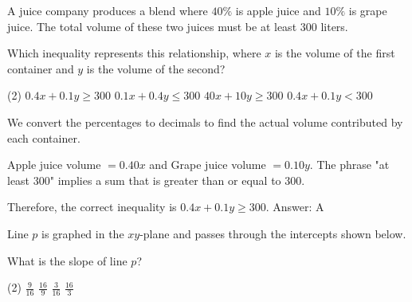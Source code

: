 \documentclass[11pt,paper=a4,answers]{exam}
\begin{document}
\begin{questions}
\vspace{1cm}

\question
A juice company produces a blend where $40\%$ is apple juice and $10\%$ is grape juice. The total volume of these two juices must be at least $300$ liters.
\begin{center}
\end{center}
Which inequality represents this relationship, where $x$ is the volume of the first container and $y$ is the volume of the second?
\begin{tasks}(2)
\task $0.4x + 0.1y \geq 300$
\task $0.1x + 0.4y \leq 300$
\task $40x + 10y \geq 300$
\task $0.4x + 0.1y < 300$
\end{tasks}

\begin{solution}
We convert the percentages to decimals to find the actual volume contributed by each container.
\vspace{5pt}
\begin{center}
Apple juice volume $= 0.40x$ and Grape juice volume $= 0.10y$.
\vspace{5pt}
The phrase "at least $300$" implies a sum that is greater than or equal to $300$.
\end{center}
\vspace{5pt}
Therefore, the correct inequality is $0.4x + 0.1y \geq 300$.
\vspace{5pt}
Answer: \colorbox{yellow!100}{A}
\end{solution}

\vspace{1cm}

\question
Line $p$ is graphed in the $xy$-plane and passes through the intercepts shown below.
\begin{center}
\end{center}
What is the slope of line $p$?
\begin{tasks}(2)
\task $\frac{9}{16}$
\task $\frac{16}{9}$
\task $\frac{3}{16}$
\task $\frac{16}{3}$
\end{tasks}


\end{questions}
\end{document}
